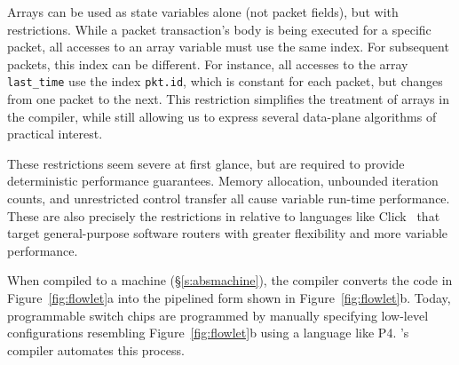 Arrays can be used as state variables alone (not packet fields), but with
restrictions. While a packet transaction's body is being executed for a
specific packet, all accesses to an array variable must use the same index. For
subsequent packets, this index can be different. For instance, all accesses to
the array \texttt{last\_time} use the index \texttt{pkt.id}, which is constant
for each packet, but changes from one packet to the next. This restriction
simplifies the treatment of arrays in the compiler, while still allowing us to
express several data-plane algorithms of practical interest.

These restrictions seem severe at first glance, but are required to provide
deterministic performance guarantees. Memory allocation, unbounded iteration
counts, and unrestricted control transfer all cause variable run-time
performance. These are also precisely the restrictions in \pktlanguage relative
to languages like Click~\cite{click} that target general-purpose software
routers with greater flexibility and more variable performance.

When compiled to a \absmachine machine (\S\ref{s:absmachine}), the \pktlanguage
compiler converts the code in Figure~\ref{fig:flowlet}a into the pipelined form
shown in Figure~\ref{fig:flowlet}b. Today, programmable switch chips are
programmed by manually specifying low-level configurations resembling
Figure~\ref{fig:flowlet}b using a language like P4. \pktlanguage's compiler
automates this process.
